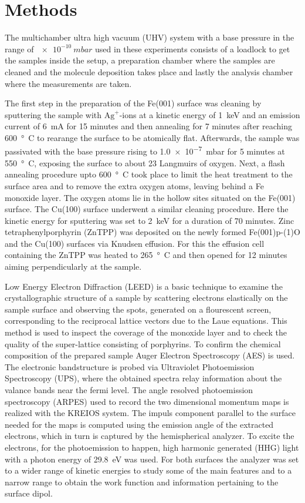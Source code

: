 \chapter{Methods}

The multichamber ultra high vacuum (UHV) system with a base pressure in the range of $\qty{e-10}{mbar}$ used in these experiments consists of a loadlock to get the samples inside the setup, a preparation chamber where the samples are cleaned and the molecule deposition takes place and lastly the analysis chamber where the measurements are taken.

The first step in the preparation of the Fe(001) surface was cleaning by sputtering the sample with $\mathrm{Ag}^+$-ions at a kinetic energy of \qty{1}{keV} and an emission current of \qty{6}{mA} for 15 minutes and then annealing for 7 minutes after reaching \qty{600}{°C} to rearange the surface to be atomically flat.
Afterwards, the sample was passivated with the base pressure rising to \qty{1.0e-7}{mbar} for 5 minutes at \qty{550}{°C}, exposing the surface to about 23 Langmuirs of oxygen.
Next, a flash annealing procedure upto \qty{600}{°C} took place to limit the heat treatment to the surface area and to remove the extra oxygen atoms, leaving behind a Fe monoxide layer.
The oxygen atoms lie in the hollow sites situated on the Fe(001) surface.
The Cu(100) surface underwent a similar cleaning procedure.
Here the kinetic energy for sputtering was set to \qty{2}{keV} for a duration of 70 minutes.
Zinc tetraphenylporphyrin (ZnTPP) was deposited on the newly formed Fe(001)p-(1)O and the Cu(100) surfaces via Knudsen effusion.
For this the effusion cell containing the ZnTPP was heated to \qty{265}{°C} and then opened for 12 minutes aiming perpendicularly at the sample.

Low Energy Electron Diffraction (LEED) is a basic technique to examine the crystallographic structure of a sample by scattering electrons elastically on the sample surface and observing the spots, generated on a flourescent screen, corresponding to the reciprocal lattice vectors due to the Laue equations.
This method is used to inspect the coverage of the monoxide layer and to check the quality of the super-lattice consisting of porphyrins.
To confirm the chemical composition of the prepared sample Auger Electron Spectroscopy (AES) is used.
The electronic bandstructure is probed via Ultraviolet Photoemission Spectroscopy (UPS), where the obtained spectra relay information about the valance bands near the fermi level.
The angle resolved photoemission spectroscopy (ARPES) used to record the two dimensional momentum maps is realized with the KREIOS system.
The impuls component parallel to the surface needed for the maps is computed using the emission angle of the extracted electrons, which in turn is captured by the hemispherical analyzer.
To excite the electrons, for the photoemission to happen, high harmonic generated (HHG) light with a photon energy of \qty{29,8}{eV} was used.
For both surfaces the analyzer was set to a wider range of kinetic energies to study some of the main features and to a narrow range to obtain the work function and information pertaining to the surface dipol.
